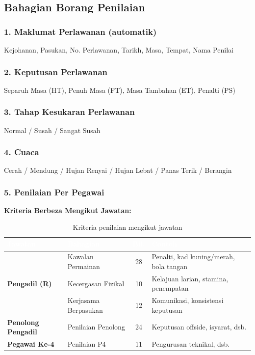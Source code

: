 \documentclass[12pt,a4paper]{report}
\begin{document}
\subsection{Bahagian Borang Penilaian}

\subsubsection{1. Maklumat Perlawanan (automatik)}
Kejohanan, Pasukan, No. Perlawanan, Tarikh, Masa, Tempat, Nama Penilai

\subsubsection{2. Keputusan Perlawanan}
Separuh Masa (HT), Penuh Masa (FT), Masa Tambahan (ET), Penalti (PS)

\subsubsection{3. Tahap Kesukaran Perlawanan}
Normal / Susah / Sangat Susah

\subsubsection{4. Cuaca}
Cerah / Mendung / Hujan Renyai / Hujan Lebat / Panas Terik / Berangin

\subsubsection{5. Penilaian Per Pegawai}

\textbf{Kriteria Berbeza Mengikut Jawatan:}

\begin{table}[H]
\centering
{}
\begin{tabularx}{\textwidth}{l l c X}
\toprule
\rowcolor{tableheader}
\textcolor{white}{\textbf{Jawatan}} & \textcolor{white}{\textbf{Bahagian}} & \textcolor{white}{\textbf{Bil.}} & \textcolor{white}{\textbf{Contoh}} \\
\midrule
\multirow{3}{*}{\textbf{Pengadil (R)}} & Kawalan Permainan & 28 & Penalti, kad kuning/merah, bola tangan \\
 & Kecergasan Fizikal & 10 & Kelajuan larian, stamina, penempatan \\
 & Kerjasama Berpasukan & 12 & Komunikasi, konsistensi keputusan \\
\midrule
\textbf{Penolong Pengadil} & Penilaian Penolong & 24 & Keputusan offside, isyarat, dsb. \\
\midrule
\textbf{Pegawai Ke-4} & Penilaian P4 & 11 & Pengurusan teknikal, dsb. \\
\bottomrule
\end{tabularx}
\caption{Kriteria penilaian mengikut jawatan}
\end{table}
\end{document}
